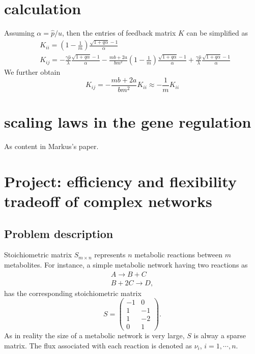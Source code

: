 \documentclass[paper=a4, fontsize=12pt]{scrartcl}	%
\numberwithin{equation}{section}					%
\numberwithin{figure}{section}					%
\numberwithin{table}{section}					%
\begin{document}
\section{calculation}
Assuming $\alpha=\hat{p}/\hat{u}$, then the entries of feedback matrix $K$ can be simplified as 
\begin{align}
\label{}
    \nonumber&K_{ii}=(1-\frac{1}{m})\frac{\sqrt{1+q\alpha}-1}{\alpha}   \\
    \nonumber& K_{ij}=-\frac{\gamma\hat{p}}{\lambda}\frac{\sqrt{1+q\alpha}-1}{\alpha}-\frac{mb+2a}{bm^2}(1-\frac{1}{m})\frac{\sqrt{1+q\alpha}-1}{\alpha}+\frac{\gamma\hat{p}}{\lambda}\frac{\sqrt{1+q\alpha}-1}{\alpha}
\end{align}
We further obtain
\begin{equation}
\label{ }
K_{ij}=-\frac{mb+2a}{bm^2}K_{ii}\approx -\frac{1}{m}K_{ii}
\end{equation}


\section{scaling laws in the gene regulation}
As content in Markus's paper.

\section{Project: efficiency and flexibility tradeoff of complex networks}
\subsection{Problem description}
Stoichiometric matrix $S_{m\times n}$ represents $n$ metabolic reactions between $m$ metabolites. For instance, a simple metabolic network having two reactions as 
\begin{eqnarray}
\nonumber A\rightarrow B + C\\
\nonumber B+2C\rightarrow D,
\end{eqnarray}
has the corresponding stoichiometric matrix 
\begin{equation}
\nonumber S=\left(\begin{array}{cc}-1 & 0 \\1 & -1 \\1 & -2 \\0 & 1\end{array}\right). 
\end{equation}
As in reality the size of a metabolic network is very large, $S$ is alway a sparse matrix. The flux associated with each reaction is denoted as $\nu_i$, $i=1,\cdots,n$.
\end{document}
